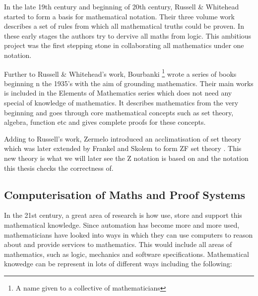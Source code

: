 In the late 19th century and beginning of 20th century, Russell \& Whitehead \cite{whitehead1912principia} started to form a basis for mathematical notation. Their three volume work describes a set of rules from which all mathematical truths could be proven. In these early stages the authors try to dervive all maths from logic. This ambitious project was the first stepping stone in collaborating all mathematics under one notation.

Further to Russell \& Whitehead's work, Bourbanki \footnote{A name given to a collective of mathematicians} wrote a series of books beginning n the 1935's with the aim of grounding mathematics. Their main works is included in the Elements of Mathematics series \cite{opac-b1128208} which does not need any special of knowledge of mathematics. It describes mathematics from the very beginning and goes through core mathematical concepts such as set theory, algebra, function etc and gives complete proofs for these concepts.

Adding to Russell's work, Zermelo introduced an acclimatisation of set theory which was later extended by Frankel and Skolem to form ZF set theory \cite{zfc}. This new theory is what we will later see the Z notation is based on and the notation this thesis checks the correctness of.

\subsection{Computerisation of Maths and Proof Systems}

In the 21st century, a great area of research is how use, store and support this mathematical knowledge. Since automation has become more and more used, mathematicians have looked into ways in which they can use computers to reason about and provide services to mathematics. This would include all areas of mathematics, such as logic, mechanics and software specifications. Mathematical knowedge can be represent in lots of different ways including the following:

